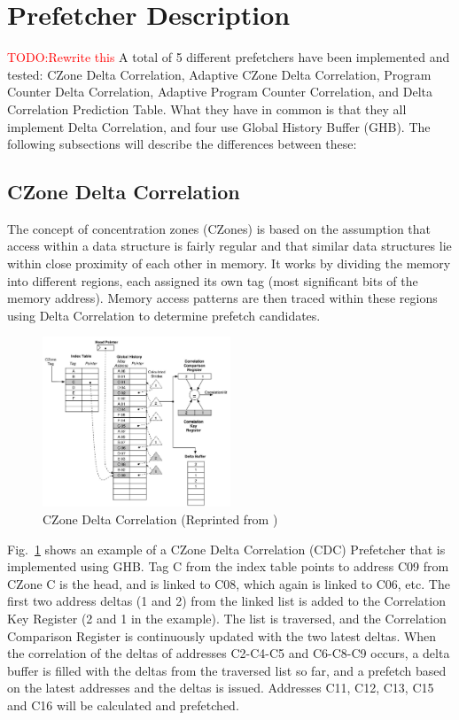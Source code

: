 \documentclass[a4paper]{IEEEtran}
\newcommand\TODO[1]{\textcolor{red}{TODO:#1}}
\newcommand\todo[1]{\TODO{#1}}
\begin{document}
\section{Prefetcher Description}

\todo{Rewrite this}
A total of 5 different prefetchers have been implemented and tested: CZone Delta Correlation, Adaptive CZone Delta Correlation, Program Counter Delta Correlation, Adaptive Program Counter Correlation, and Delta Correlation Prediction Table. 
What they have in common is that they all implement Delta Correlation, and four use Global History Buffer (GHB). 
The following subsections will describe the differences between these:

\subsection{CZone Delta Correlation}

The concept of concentration zones (CZones) is based on the assumption that access within a data structure is fairly regular and that similar data structures lie within close proximity of each other in memory.
It works by dividing the memory into different regions, each assigned its own tag (most significant bits of the memory address).
Memory access patterns are then traced within these regions using Delta Correlation to determine prefetch candidates.

\begin{figure}[!ht]
  \centering
      \includegraphics[width=0.5\textwidth]{Figures/CDC}
  \caption{CZone Delta Correlation (Reprinted from \protect\cite{acdc})}
  \label{fig:CDC}
\end{figure}

Fig.~\ref{fig:CDC} shows an example of a CZone Delta Correlation (CDC) Prefetcher that is implemented using GHB. 
Tag C from the index table points to address C09 from CZone C is the head, and is linked to C08,  which again is linked to C06, etc. 
The first two address deltas (1 and 2) from the linked list is added to the Correlation Key Register (2 and 1 in the example). 
The list is traversed, and the Correlation Comparison Register is continuously updated with the two latest deltas. 
When the correlation of the deltas of addresses C2-C4-C5 and C6-C8-C9  occurs, a delta buffer is filled with the deltas from the traversed list so far, and a prefetch based on the latest addresses and the deltas is issued.
Addresses C11, C12, C13, C15 and C16 will be calculated and prefetched.
\end{document}
